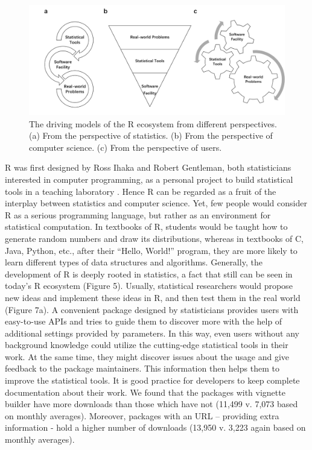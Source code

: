 \begin{Schunk}
\begin{figure}
\includegraphics[width=1\linewidth,height=0.3\textheight]{fig7} \caption[The driving models of the R ecosystem from different perspectives]{The driving models of the R ecosystem from different perspectives. (a) From the perspective of statistics. (b) From the perspective of computer science. (c) From the perspective of users. }\label{fig:fig7}
\end{figure}
\end{Schunk}

R was first designed by Ross Ihaka and Robert Gentleman, both
statisticians interested in computer programming, as a personal project
to build statistical tools in a teaching laboratory \citep{Ihaka-500}.
Hence R can be regarded as a fruit of the interplay between statistics
and computer science. Yet, few people would consider R as a serious
programming language, but rather as an environment for statistical
computation. In textbooks of R, students would be taught how to generate
random numbers and draw its distributions, whereas in textbooks of C,
Java, Python, etc., after their ``Hello, World!'' program, they are more
likely to learn different types of data structures and algorithms.
Generally, the development of R is deeply rooted in statistics, a fact
that still can be seen in today's R ecosystem (Figure 5). Usually,
statistical researchers would propose new ideas and implement these
ideas in R, and then test them in the real world (Figure 7a). A
convenient package designed by statisticians provides users with
easy-to-use APIs and tries to guide them to discover more with the help
of additional settings provided by parameters. In this way, even users
without any background knowledge could utilize the cutting-edge
statistical tools in their work. At the same time, they might discover
issues about the usage and give feedback to the package maintainers.
This information then helps them to improve the statistical tools. It is
good practice for developers to keep complete documentation about their
work. We found that the packages with vignette builder have more
downloads than those which have not (11,499 v. 7,073 based on monthly
averages). Moreover, packages with an URL -- providing extra information
- hold a higher number of downloads (13,950 v. 3,223 again based on
monthly averages).


